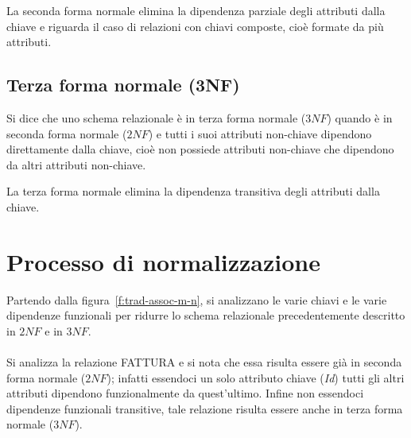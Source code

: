 	La seconda forma normale elimina la dipendenza parziale degli attributi dalla chiave e riguarda il caso di relazioni con chiavi composte, cioè formate da più attributi.
	
	\subsection{Terza forma normale (3NF)}
	Si dice che uno schema relazionale è in terza forma normale ($3NF$) quando è in seconda forma normale ($2NF$) e tutti i suoi attributi non-chiave dipendono direttamente dalla chiave, cioè non possiede attributi non-chiave che dipendono da altri attributi non-chiave.
	
	La terza forma normale elimina la dipendenza transitiva degli attributi dalla chiave.
	
\section{Processo di normalizzazione}
Partendo dalla figura~\vref{f:trad-assoc-m-n}, si analizzano le varie chiavi e le varie dipendenze funzionali per ridurre lo schema relazionale precedentemente descritto in $2NF$ e in $3NF$.\\
\\
Si analizza la relazione FATTURA e si nota che essa risulta essere già in seconda forma normale ($2NF$);
infatti essendoci un solo attributo chiave (\emph{Id}) tutti gli altri attributi dipendono funzionalmente da quest'ultimo.
Infine non essendoci dipendenze funzionali transitive, tale relazione risulta essere anche in terza forma normale ($3NF$).

